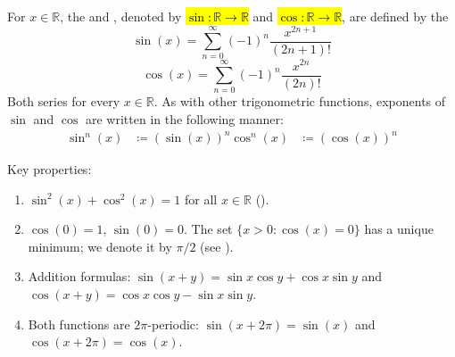 \begin{definition} \label{definition:real_sine_and_cosine_functions_on_real_line_via_power_series}
For $x \in \mathbb{R}$, the  and , denoted by \hl{$\sin : \mathbb{R} \to \mathbb{R}$} and \hl{$\cos : \mathbb{R} \to \mathbb{R}$}, are defined by the 
$$\sin(x) = \sum_{n=0}^\infty (-1)^n \frac{x^{2n+1}}{(2n+1)!}$$
$$\cos(x) = \sum_{n=0}^\infty (-1)^n \frac{x^{2n}}{(2n)!}$$
Both series  for every $x \in \mathbb{R}$. As with other trigonometric functions, exponents of $\sin$ and $\cos$ are written in the following manner:
\begin{align*}
    \sin^n(x) &\coloneq (\sin(x))^n
    \cos^n(x) &\coloneq (\cos(x))^n
\end{align*}

Key properties:
\begin{enumerate}
    \item $\sin^2(x) + \cos^2(x) = 1$ for all $x \in \mathbb{R}$ ().
    \item $\cos(0) = 1$, $\sin(0) = 0$. The set $\{x > 0 : \cos(x) = 0\}$ has a unique minimum; we denote it by $\pi/2$ (see ).
    \item Addition formulas: $\sin(x+y) = \sin x \cos y + \cos x \sin y$ and $\cos(x+y) = \cos x \cos y - \sin x \sin y$.
    \item Both functions are $2\pi$-periodic: $\sin(x + 2\pi) = \sin(x)$ and $\cos(x + 2\pi) = \cos(x)$.
\end{enumerate}
\end{definition}
